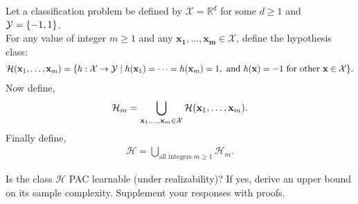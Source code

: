 Let a classification problem be defined by $\mathcal{X} = \mathbb{R}^d$ for some $d \geq 1$ and ${\cal Y} = \{-1,1\}$. \\
For any value of integer $m \geq 1$ and any $\mathbf{x_1},\ldots,\mathbf{x_m} \in \mathcal{X}$, define the hypothesis class:
\begin{align*}
    \mathcal{H}(\mathbf{x}_1,\ldots,\mathbf{x}_m) = \{ h: \mathcal{X} \rightarrow \mathcal{Y} \;|\; h(\mathbf{x}_1) = \cdots = h(\mathbf{x}_m) = 1, ~ \text{and } h(\mathbf{x})=-1 \text{ for other  } \mathbf{x} \in \mathcal{X} \}.
\end{align*}
Now define,
\begin{align*}
    \mathcal{H}_m = \bigcup_{\mathbf{x}_1,\ldots,\mathbf{x}_m \in \mathcal{X}} \mathcal{H}(\mathbf{x}_1,\ldots,\mathbf{x}_m).
\end{align*}
Finally define,
\begin{align*}
    \mathcal{H} = \bigcup_{\text{all integers } m \geq 1} \mathcal{H}_m.
\end{align*}


Is the class $\mathcal{H}$ PAC learnable (under realizability)? If yes, derive an upper bound on its sample complexity. Supplement your responses with proofs.
